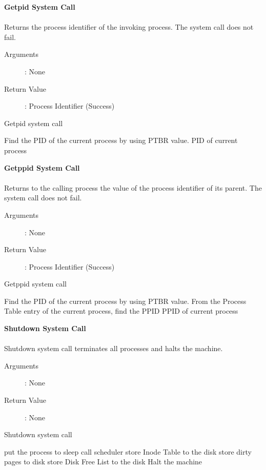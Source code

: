 \documentclass[10pt]{article}
\begin{document}
\vspace{3mm}
\textbf{Getpid System Call}\\ \\
 Returns the process identifier of the invoking process. The system call does not fail.
\begin{description}
\item[Arguments]: None
\item[Return Value]: Process Identifier (Success) 
\end{description} 
\begin{algorithm}
\caption{Getpid system call}
\begin{algorithmic}
\STATE Find the PID of the current process by using PTBR value.
\RETURN PID of current process
\end{algorithmic}
\end{algorithm}
\textbf{Getppid System Call}\\ \\
 Returns to the calling process the value of the process identifier of its parent. The system call does not fail.
\begin{description}
\item[Arguments]: None
\item[Return Value]: Process Identifier (Success) 
\end{description} 
\begin{algorithm}
\caption{Getppid system call}
\begin{algorithmic}
\STATE Find the PID of the current process by using PTBR value.
\STATE From the Process Table entry of the current process, find the PPID
\RETURN PPID of current process
\end{algorithmic}
\end{algorithm}
\textbf{Shutdown System Call}
\\ \\
Shutdown system call terminates all processes and halts the machine. \begin{description}
\item[Arguments]: None
\item[Return Value]: None
\end{description} 
\begin{algorithm}
\caption{Shutdown system call}
\begin{algorithmic}
    \STATE put the process to sleep
    \STATE call scheduler
\ENDWHILE
\STATE store Inode Table to the disk
\STATE store dirty pages to disk
\STATE store Disk Free List to the disk
\STATE Halt the machine
\RETURN 
\end{algorithmic}
\end{algorithm}
\vspace{20mm}
\end{document}
